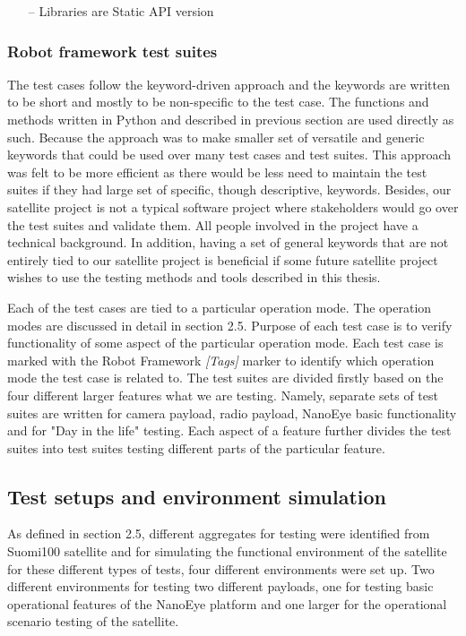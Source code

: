 \documentclass[english,12pt,a4paper,pdftex,elec,utf8]{aaltothesis}
\begin{document}
 
\begin{itemize}
\item[--]Libraries are Static API version 
\end{itemize}     
\subsubsection{Robot framework test suites}
The test cases follow the keyword-driven approach and the keywords are written to be short and mostly to be non-specific to the test case. The functions and methods written in Python and described in previous section are used directly as such. Because the approach was to make smaller set of versatile and generic keywords that could be used over many test cases and test suites. This approach was felt to be more efficient as there would be less need to maintain the test suites if they had large set of specific, though descriptive, keywords. Besides, our satellite project is not a typical software project where stakeholders would go over the test suites and validate them. All people involved in the project have a technical background. In addition, having a set of general keywords that are not entirely tied to our satellite project is beneficial if some future satellite project wishes to use the testing methods and tools described in this thesis.\par
Each of the test cases are tied to a particular operation mode. The operation modes are discussed in detail in section 2.5. Purpose of each test case is to verify functionality of some aspect of the particular operation mode. Each test case is marked with the Robot Framework \textit{[Tags]} marker to identify which operation mode the test case is related to. The test suites are divided firstly based on the four different larger features what we are testing. Namely, separate sets of test suites are written for camera payload, radio payload, NanoEye basic functionality and for "Day in the life" testing. Each aspect of a feature further divides the test suites into test suites testing different parts of the particular feature.\par   
\subsection{Test setups and environment simulation}
As defined in section 2.5, different aggregates for testing were identified from Suomi100 satellite and for simulating the functional environment of the satellite for these different types of tests, four different environments were set up. Two different environments for testing two different payloads, one for testing basic operational features of the NanoEye platform and one larger for the operational scenario testing of the satellite. 
\end{document}
